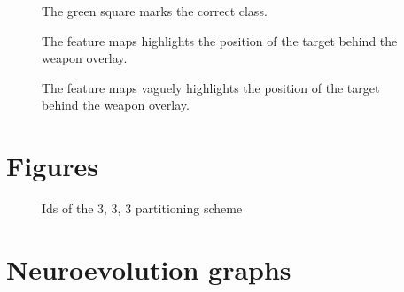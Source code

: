 \begin{figure}[H]
	\begin{center}
	\begin{scriptsize}
		\sffamily
		
	\end{scriptsize}
	\end{center}
	\caption[Feature maps image]{The green square marks the correct class.}
	\label{fig:hp1}
\end{figure}

\begin{figure}[H]
	\begin{center}
	\begin{scriptsize}
		\sffamily
		
	\end{scriptsize}
	\end{center}
	\caption[Feature maps]{The feature maps highlights the position of the target behind the weapon overlay.}
\end{figure}

\begin{figure}[H]
	\begin{center}
	\begin{scriptsize}
		\sffamily
		
	\end{scriptsize}
	\end{center}
	\caption[Feature maps]{The feature maps vaguely highlights the position of the target behind the weapon overlay.}
\end{figure}


\section{Figures}

\begin{figure}[H]
	\begin{scriptsize}
		\sffamily
		\def\svgwidth{\textwidth}
		
	\end{scriptsize}
	\caption{Ids of the 3, 3, 3 partitioning scheme}
	\label{fig:ids}
\end{figure}

\section{Neuroevolution graphs}
\label{sec:neuroevolution-graphs}







